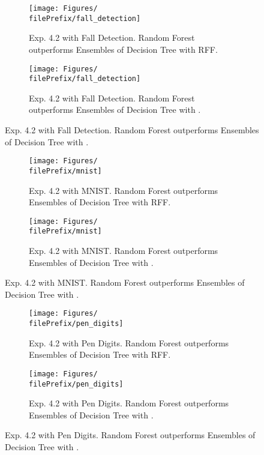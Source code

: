 \begin{figure}[H]
  \centering
  \renewcommand{\filePrefix}{\undPrefix/rff}
  \begin{subfigure}[t]{0.5\linewidth}
    \centering\captionsetup{width=.8\linewidth}\texttt{[image: Figures/\\filePrefix/fall\_detection]}
    \caption{Exp. 4.2 with Fall Detection. Random Forest outperforms Ensembles of Decision Tree with RFF.}
    \label{fig:\undPrefix_fall_detection}
  \end{subfigure}%
  \renewcommand{\filePrefix}{\undPrefix/nys}%
  \begin{subfigure}[t]{0.5\linewidth}
    \centering\captionsetup{width=.8\linewidth}\texttt{[image: Figures/\\filePrefix/fall\_detection]}
    \caption{Exp. 4.2 with Fall Detection. Random Forest outperforms Ensembles of Decision Tree with \Nys.}
    \label{fig:\undPrefix_fall_detection}
  \end{subfigure}%
\end{figure}


\begin{figure}[H]
  \centering
  \renewcommand{\filePrefix}{\undPrefix/rff}
  \begin{subfigure}[t]{0.5\linewidth}
    \centering\captionsetup{width=.8\linewidth}\texttt{[image: Figures/\\filePrefix/mnist]}
    \caption{Exp. 4.2 with MNIST. Random Forest outperforms Ensembles of Decision Tree with RFF.}
    \label{fig:\undPrefix_mnist}
  \end{subfigure}%
  \renewcommand{\filePrefix}{\undPrefix/nys}%
  \begin{subfigure}[t]{0.5\linewidth}
    \centering\captionsetup{width=.8\linewidth}\texttt{[image: Figures/\\filePrefix/mnist]}
    \caption{Exp. 4.2 with MNIST. Random Forest outperforms Ensembles of Decision Tree with \Nys.}
    \label{fig:\undPrefix_mnist}
  \end{subfigure}
\end{figure}


\begin{figure}[H]
  \centering
  \renewcommand{\filePrefix}{\undPrefix/rff}
  \begin{subfigure}[t]{0.5\linewidth}
    \centering\captionsetup{width=.8\linewidth}\texttt{[image: Figures/\\filePrefix/pen\_digits]}
    \caption{Exp. 4.2 with Pen Digits. Random Forest outperforms Ensembles of Decision Tree with RFF.}
    \label{fig:\undPrefix_pen_digits}
  \end{subfigure}%
  \renewcommand{\filePrefix}{\undPrefix/nys}%
  \begin{subfigure}[t]{0.5\linewidth}
    \centering\captionsetup{width=.8\linewidth}\texttt{[image: Figures/\\filePrefix/pen\_digits]}
    \caption{Exp. 4.2 with Pen Digits. Random Forest outperforms Ensembles of Decision Tree with \Nys.}
    \label{fig:\undPrefix_pen_digits}
  \end{subfigure}%
\end{figure}


